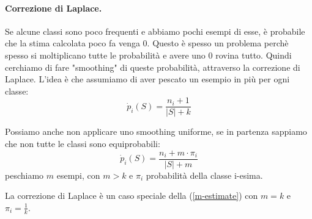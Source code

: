 \paragraph{Correzione di Laplace.} Se alcune classi sono poco frequenti e abbiamo pochi esempi di esse, è probabile che la stima calcolata poco fa venga 0. Questo è spesso un problema perchè spesso si moltiplicano tutte le probabilità e avere uno 0 rovina tutto. Quindi cerchiamo di fare "smoothing" di queste probabilità, attraverso la correzione di Laplace. L'idea è che assumiamo di aver pescato un esempio in più per ogni classe:
\begin{equation}
    \dot{p}_i(S)=\frac{n_i+1}{|S|+k}
    \label{m-estimate}
\end{equation}

Possiamo anche non applicare uno smoothing uniforme, se in partenza sappiamo che non tutte le classi sono equiprobabili:
\begin{equation}
    \dot{p}_i(S)=\frac{n_i+m\cdot \pi_i}{|S|+m}
\end{equation}
peschiamo $m$ esempi, con $m>k$ e $\pi_i$ probabilità della classe i-esima.

La correzione di Laplace è un caso speciale della (\ref{m-estimate}) con $m=k$ e $\pi_i=\frac{1}{k}$.

